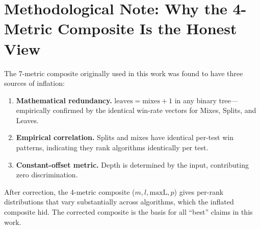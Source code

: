\section{Methodological Note: Why the 4-Metric Composite Is the Honest View}

The 7-metric composite originally used in this work was found to have three sources of inflation:

\begin{enumerate}
    \item \textbf{Mathematical redundancy.} $\text{leaves} = \text{mixes} + 1$ in any binary tree---empirically confirmed by the identical win-rate vectors for Mixes, Splits, and Leaves.
    \item \textbf{Empirical correlation.} Splits and mixes have identical per-test win patterns, indicating they rank algorithms identically per test.
    \item \textbf{Constant-offset metric.} Depth is determined by the input, contributing zero discrimination.
\end{enumerate}

After correction, the 4-metric composite ($m, l, \text{maxL}, p$) gives per-rank distributions that vary substantially across algorithms, which the inflated composite hid. The corrected composite is the basis for all ``best'' claims in this work.
